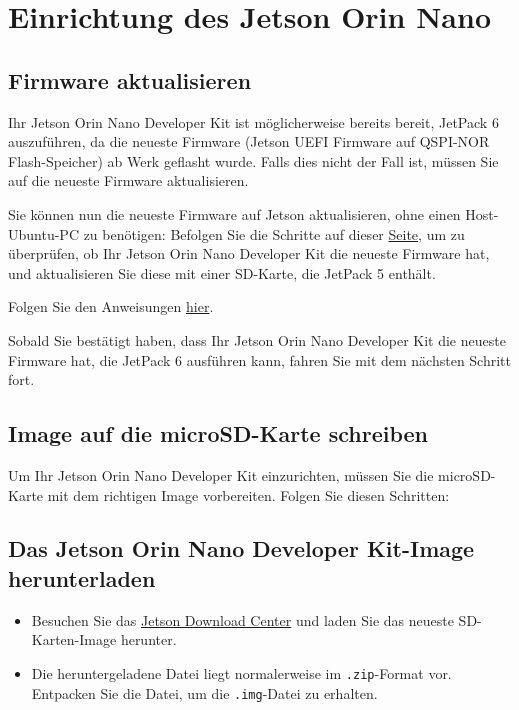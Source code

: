 \documentclass[12pt,a4paper]{report}
\begin{document}
\newpage
\section{Einrichtung des Jetson Orin Nano}
\subsection{Firmware aktualisieren}
Ihr Jetson Orin Nano Developer Kit ist möglicherweise bereits bereit, JetPack 6 auszuführen, da die neueste Firmware (Jetson UEFI Firmware auf QSPI-NOR Flash-Speicher) ab Werk geflasht wurde. Falls dies nicht der Fall ist, müssen Sie auf die neueste Firmware aktualisieren.

Sie können nun die neueste Firmware auf Jetson aktualisieren, ohne einen Host-Ubuntu-PC 
zu benötigen: Befolgen Sie die Schritte auf dieser \textcolor{blue}{\href{https://www.jetson-ai-lab.com/initial_setup_jon.html}{Seite}}, 
um zu überprüfen, ob Ihr Jetson Orin Nano Developer Kit die neueste Firmware hat, 
und aktualisieren Sie diese mit einer SD-Karte, die JetPack 5 enthält.

Folgen Sie den Anweisungen \textcolor{blue}{\href{https://www.jetson-ai-lab.com/initial_setup_jon.html}{hier}}.

Sobald Sie bestätigt haben, dass Ihr Jetson Orin Nano Developer Kit die neueste 
Firmware hat, die JetPack 6 ausführen kann, fahren Sie mit dem nächsten Schritt fort.
\clearpage

\subsection{Image auf die microSD-Karte schreiben}

Um Ihr Jetson Orin Nano Developer Kit einzurichten, müssen Sie die microSD-Karte 
mit dem richtigen Image vorbereiten. Folgen Sie diesen Schritten:

\subsection{Das Jetson Orin Nano Developer Kit-Image herunterladen}
\begin{itemize}
    \item Besuchen Sie das \href{https://developer.nvidia.com/embedded/downloads}{Jetson Download Center} 
    und laden Sie das neueste SD-Karten-Image herunter.
    \item Die heruntergeladene Datei liegt normalerweise im \texttt{.zip}-Format vor. 
    Entpacken Sie die Datei, um die \texttt{.img}-Datei zu erhalten.
\end{itemize}
\end{document}
